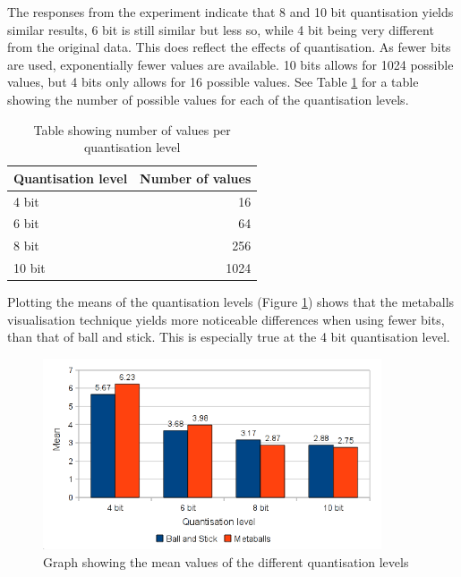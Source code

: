 The responses from the experiment indicate that 8 and 10 bit quantisation
yields similar results, 6 bit is still similar but less so, while 4 bit being
very different from the original data. This does reflect the effects of
quantisation. As fewer bits are used, exponentially fewer values are available.
10 bits allows for 1024 possible values, but 4 bits only allows for 16 possible
values. See Table \ref{tab:results_bitvalues} for a table showing the number
of possible values for each of the quantisation levels.

\begin{table}[h!]
  \begin{tabular}{ | l | r | }
  \hline
  Quantisation level & Number of values  \\ \hline
  4 bit              &               16  \\ \hline
  6 bit              &               64  \\ \hline
  8 bit              &              256  \\ \hline
  10 bit             &             1024  \\ \hline
  \end{tabular}
  \caption{Table showing number of values per quantisation level}
  \label{tab:results_bitvalues}
\end{table}

Plotting the means of the quantisation levels (Figure
\ref{fig:results_bm_means}) shows that the metaballs visualisation technique
yields more noticeable differences when using fewer bits, than that of ball and
stick. This is especially true at the 4 bit quantisation level.

\begin{figure}[h!]
  \begin{center}
    \includegraphics[width=100mm]{bm_means}
  \end{center}
  \caption{Graph showing the mean values of the different quantisation levels}
  \label{fig:results_bm_means}
\end{figure}

